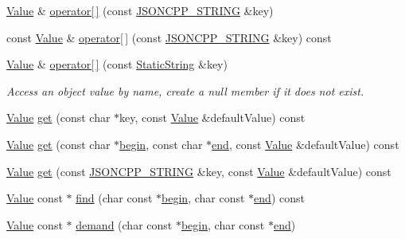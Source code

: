 \begin{DoxyCompactItemize}
\item 
\hyperlink{class_json_1_1_value}{Value} \& \hyperlink{class_json_1_1_value_aedd1e152756a4cc8c1ebac0dd7aeeb78}{operator\mbox{[}$\,$\mbox{]}} (const \hyperlink{config_8h_a1e723f95759de062585bc4a8fd3fa4be}{J\+S\+O\+N\+C\+P\+P\+\_\+\+S\+T\+R\+I\+NG} \&key)
\item 
const \hyperlink{class_json_1_1_value}{Value} \& \hyperlink{class_json_1_1_value_aba60f69dcd85e935aa85e7a517e03427}{operator\mbox{[}$\,$\mbox{]}} (const \hyperlink{config_8h_a1e723f95759de062585bc4a8fd3fa4be}{J\+S\+O\+N\+C\+P\+P\+\_\+\+S\+T\+R\+I\+NG} \&key) const
\item 
\hyperlink{class_json_1_1_value}{Value} \& \hyperlink{class_json_1_1_value_ac3763d7d315ca65dc188e273722f7955}{operator\mbox{[}$\,$\mbox{]}} (const \hyperlink{class_json_1_1_static_string}{Static\+String} \&key)
\begin{DoxyCompactList}\small\item\em Access an object value by name, create a null member if it does not exist. \end{DoxyCompactList}\item 
\hyperlink{class_json_1_1_value}{Value} \hyperlink{class_json_1_1_value_a57de86629ed23246f14014fb6c44fa67}{get} (const char $\ast$key, const \hyperlink{class_json_1_1_value}{Value} \&default\+Value) const
\item 
\hyperlink{class_json_1_1_value}{Value} \hyperlink{class_json_1_1_value_aa59ed050e87e1d58d93671a38687f36c}{get} (const char $\ast$\hyperlink{class_json_1_1_value_a015459a3950c198d63a2d3be8f5ae296}{begin}, const char $\ast$\hyperlink{class_json_1_1_value_a3e443cd0ef24f7e028b175e47ee045e0}{end}, const \hyperlink{class_json_1_1_value}{Value} \&default\+Value) const
\item 
\hyperlink{class_json_1_1_value}{Value} \hyperlink{class_json_1_1_value_a7406e6af727c288bf8ab59945ece686a}{get} (const \hyperlink{config_8h_a1e723f95759de062585bc4a8fd3fa4be}{J\+S\+O\+N\+C\+P\+P\+\_\+\+S\+T\+R\+I\+NG} \&key, const \hyperlink{class_json_1_1_value}{Value} \&default\+Value) const
\item 
\hyperlink{class_json_1_1_value}{Value} const  $\ast$ \hyperlink{class_json_1_1_value_afb007b9ce9b2cf9d5f667a07e5e0349f}{find} (char const $\ast$\hyperlink{class_json_1_1_value_a015459a3950c198d63a2d3be8f5ae296}{begin}, char const $\ast$\hyperlink{class_json_1_1_value_a3e443cd0ef24f7e028b175e47ee045e0}{end}) const
\item 
\hyperlink{class_json_1_1_value}{Value} const  $\ast$ \hyperlink{class_json_1_1_value_afeb7ff596a0929d90c5f2f3cffb413ed}{demand} (char const $\ast$\hyperlink{class_json_1_1_value_a015459a3950c198d63a2d3be8f5ae296}{begin}, char const $\ast$\hyperlink{class_json_1_1_value_a3e443cd0ef24f7e028b175e47ee045e0}{end})

\end{DoxyCompactItemize}
